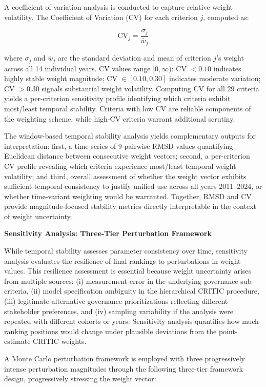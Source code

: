 \documentclass[12pt,a4paper]{article}
\begin{document}
A coefficient of variation analysis is conducted to capture relative weight volatility. The Coefficient of Variation (CV) for each criterion $j$, computed as:

\begin{equation}
\text{CV}_j = \frac{\sigma_j}{\bar{w}_j}
\end{equation}

where $\sigma_j$ and $\bar{w}_j$ are the standard deviation and mean of criterion $j$'s weight across all 14 individual years. CV values range $[0, \infty)$: CV $< 0.10$ indicates highly stable weight magnitude; CV $\in [0.10, 0.30]$ indicates moderate variation; CV $> 0.30$ signals substantial weight volatility. Computing CV for all 29 criteria yields a per-criterion sensitivity profile identifying which criteria exhibit most/least temporal stability. Criteria with low CV are reliable components of the weighting scheme, while high-CV criteria warrant additional scrutiny.

The window-based temporal stability analysis yields complementary outputs for interpretation: first, a time-series of 9 pairwise RMSD values quantifying Euclidean distance between consecutive weight vectors; second, a per-criterion CV profile revealing which criteria experience most/least temporal weight volatility; and third, overall assessment of whether the weight vector exhibits sufficient temporal consistency to justify unified use across all years 2011--2024, or whether time-variant weighting would be warranted. Together, RMSD and CV provide magnitude-focused stability metrics directly interpretable in the context of weight uncertainty.

\textbf{Sensitivity Analysis: Three-Tier Perturbation Framework}

While temporal stability assesses parameter consistency over time, sensitivity analysis evaluates the resilience of final rankings to perturbations in weight values. This resilience assessment is essential because weight uncertainty arises from multiple sources: (i) measurement error in the underlying governance sub-criteria, (ii) model specification ambiguity in the hierarchical CRITIC procedure, (iii) legitimate alternative governance prioritizations reflecting different stakeholder preferences, and (iv) sampling variability if the analysis were repeated with different cohorts or years. Sensitivity analysis quantifies how much ranking positions would change under plausible deviations from the point-estimate CRITIC weights.

A Monte Carlo perturbation framework is employed with three progressively intense perturbation magnitudes through the following three-tier framework design, progressively stressing the weight vector:
\end{document}
